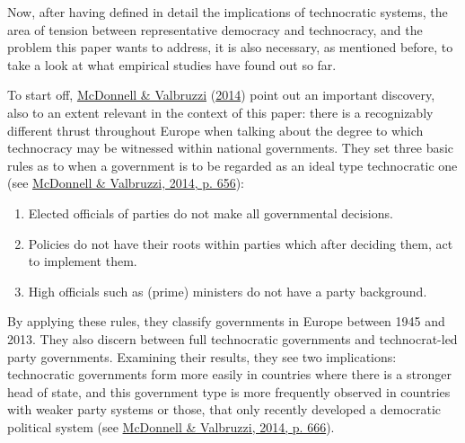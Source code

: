 \documentclass[
  12pt,
  english,
]{article}
\providecommand{\tightlist}{%
  \setlength{\itemsep}{0pt}\setlength{\parskip}{0pt}}
\begin{document}
Now, after having defined in detail the implications of technocratic
systems, the area of tension between representative democracy and
technocracy, and the problem this paper wants to address, it is also
necessary, as mentioned before, to take a look at what empirical studies
have found out so far.

To start off, \protect\hyperlink{ref-mcdonnell2014defining}{McDonnell \&
Valbruzzi} (\protect\hyperlink{ref-mcdonnell2014defining}{2014}) point
out an important discovery, also to an extent relevant in the context of
this paper: there is a recognizably different thrust throughout Europe
when talking about the degree to which technocracy may be witnessed
within national governments. They set three basic rules as to when a
government is to be regarded as an ideal type technocratic one (see
\protect\hyperlink{ref-mcdonnell2014defining}{McDonnell \& Valbruzzi,
2014, p. 656}):

\begin{enumerate}
\def\labelenumi{\arabic{enumi}.}
\tightlist
\item
  Elected officials of parties do not make all governmental decisions.
\item
  Policies do not have their roots within parties which after deciding
  them, act to implement them.
\item
  High officials such as (prime) ministers do not have a party
  background.
\end{enumerate}

By applying these rules, they classify governments in Europe between
1945 and 2013. They also discern between full technocratic governments
and technocrat-led party governments. Examining their results, they see
two implications: technocratic governments form more easily in countries
where there is a stronger head of state, and this government type is
more frequently observed in countries with weaker party systems or
those, that only recently developed a democratic political system (see
\protect\hyperlink{ref-mcdonnell2014defining}{McDonnell \& Valbruzzi,
2014, p. 666}).
\end{document}
